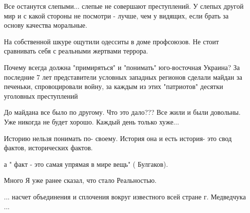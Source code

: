 \begin{itemize}

Все останутся слепыми... слепые не совершают преступлений. У слепых другой мир
и с какой стороны не посмотри - лучше, чем у видящих, если брать за основу
качества моральные.


На собственной шкуре ощутили одесситы в доме профсоюзов. Не стоит сравнивать
себя с реальными жертвами террора.


Почему всегда должна "примиряться" и "понимать" юго-восточная Украина? За
последние 7 лет представители условных западных регионов сделали майдан за
печеньки, спровоцировали войну, за каждым из этих "патриотов" десятки уголовных
преступлений


 
До майдана все было по другому. Что это дало??? Все жили и были довольны. Уже никогда не будет хорошо. Каждый день только хуже...


 

Историю нельзя понимать по- своему. История она и есть история- это свод фактов, исторических фактов.

а " факт - это самая упрямая в мире вещь" ( Булгаков).


 

Много Я уже ранее сказал, что стало Реальностью.

... насчет объединения и сплочения вокруг известного всей стране г. Медведчука
...


\end{itemize}
